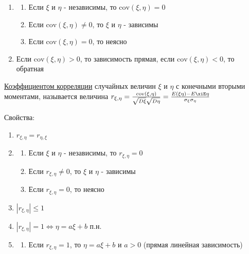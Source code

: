 \documentclass[12pt]{article}
\begin{document}
\begin{enumerate}
\begin{enumerate}
        \item \begin{enumerate}
            \item Если $\xi$ и $\eta$ - независимы, то $\mathrm{cov}(\xi, \eta) = 0$

            \item Если $\mathrm{cov}(\xi, \eta) \neq 0$, то $\xi$ и $\eta$ - зависимы

            \item Если $\mathrm{cov}(\xi, \eta) = 0$, то неясно
        \end{enumerate}

        \item Если $\mathrm{cov}(\xi, \eta) > 0$, то зависимость прямая, если $\mathrm{cov}(\xi, \eta) < 0$, то обратная
    \end{enumerate}

    \hyperlink{correlation}{Коэффициентом корреляции} случайных величин $\xi$ и $\eta$ с конечными вторыми моментами,
    называется величина $r_{\xi,\eta} = \frac{\mathrm{cov(\xi, \eta)}}{\sqrt{D\xi} \sqrt{D\eta}} = \frac{E(\xi\eta) - E\xiE\eta}{\sigma_\xi \sigma_\eta}$
    
    Свойства:

    \begin{enumerate}
        \item $r_{\xi, \eta} = r_{\eta, \xi}$

        \item \begin{enumerate}
            \item Если $\xi$ и $\eta$ - независимы, то $r_{\xi,\eta} = 0$

            \item Если $r_{\xi,\eta} \neq 0$, то $\xi$ и $\eta$ - зависимы

            \item Если $r_{\xi,\eta} = 0$, то неясно
        \end{enumerate}

        \item $|r_{\xi,\eta}| \leq 1$

        \item $|r_{\xi,\eta}| = 1 \Longleftrightarrow \eta = a \xi + b$ п.н.

        \item \begin{enumerate} 
            \item Если $r_{\xi,\eta} = 1$, то $\eta = a\xi + b$ и $a > 0$ (прямая линейная зависимость)


\end{enumerate}
\end{enumerate}
\end{enumerate}
\end{document}
